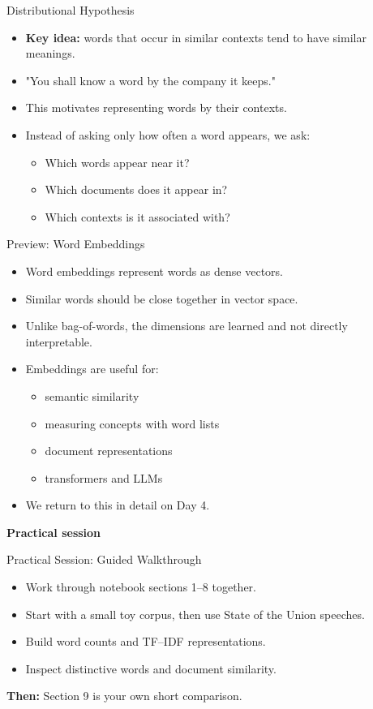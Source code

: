 \documentclass[11pt,aspectratio=43]{beamer}
\begin{document}
\begin{frame}{Distributional Hypothesis}
\begin{itemize}
\item \textbf{Key idea:} words that occur in similar contexts tend to have similar meanings.
\item "You shall know a word by the company it keeps."
\item This motivates representing words by their contexts.
\item Instead of asking only how often a word appears, we ask:
  \begin{itemize}
  \item Which words appear near it?
  \item Which documents does it appear in?
  \item Which contexts is it associated with?
  \end{itemize}
\end{itemize}
\end{frame}

\begin{frame}{Preview: Word Embeddings}
\begin{itemize}
\item Word embeddings represent words as dense vectors.
\item Similar words should be close together in vector space.
\item Unlike bag-of-words, the dimensions are learned and not directly interpretable.
\item Embeddings are useful for:
  \begin{itemize}
  \item semantic similarity
  \item measuring concepts with word lists
  \item document representations
  \item transformers and LLMs
  \end{itemize}
\item We return to this in detail on Day 4.
\end{itemize}
\end{frame}

\begin{frame}[plain]
  \centering
  \vfill
  {\LARGE\bfseries
   Practical session \par}
  \vfill
\end{frame}

\begin{frame}{Practical Session: Guided Walkthrough}
\begin{itemize}
\item Work through notebook sections 1--8 together.
\item Start with a small toy corpus, then use State of the Union speeches.
\item Build word counts and TF--IDF representations.
\item Inspect distinctive words and document similarity.
\end{itemize}
\vspace{0.8em}
\textbf{Then:} Section 9 is your own short comparison.
\end{frame}
\end{document}
